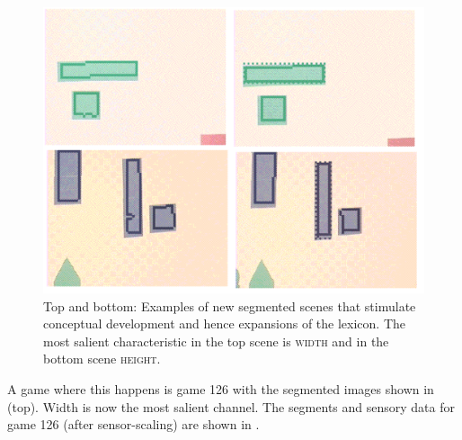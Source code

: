 \begin{figure}
\begin{center}
\includegraphics[width=0.8\columnwidth]{chap7/figs/plate-13.pdf}
\end{center}
\caption{Top and bottom: Examples of new segmented scenes that stimulate conceptual development
and hence expansions of the lexicon. The most salient characteristic in the top scene is \textsc{width} and in the bottom 
scene \textsc{height}.}
\label{fig:plate-13}
\end{figure}

A game where this happens is game 126 with the segmented images
shown in  (top). Width is now the most salient
channel. The segments and sensory data for game 126 
(after sensor-scaling) are shown in . 

